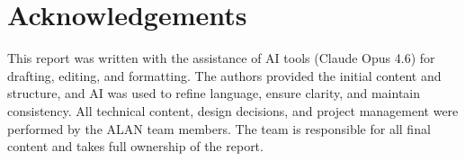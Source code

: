 
\section{Acknowledgements}
\label{app:acknowledgements}

This report was written with the assistance of AI tools (Claude Opus 4.6) for drafting, editing, and formatting. The authors provided the initial content and structure, and AI was used to refine language, ensure clarity, and maintain consistency. All technical content, design decisions, and project management were performed by the ALAN team members. The team is responsible for all final content and takes full ownership of the report. 

